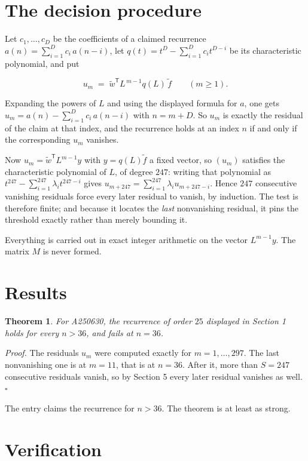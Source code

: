 \documentclass[11pt]{article}
\newtheorem{theorem}{Theorem}
\theoremstyle{definition}
\begin{document}
\section{The decision procedure}

Let $c_1,\dots,c_D$ be the coefficients of a claimed recurrence $a(n) = \sum_{i=1}^{D} c_i\,a(n-i)$, let $q(t) = t^{D} - \sum_{i=1}^{D} c_i t^{D-i}$ be its characteristic polynomial, and put

\[u_m \;=\; \tilde w^{\mathsf T} L^{\,m-1} q(L)\,\tilde f \qquad (m \ge 1).\]

Expanding the powers of $L$ and using the displayed formula for $a$, one gets $u_m = a(n) - \sum_{i=1}^{D} c_i\,a(n-i)$ with $n = m + D$. So $u_m$ is exactly the residual of the claim at that index, and the recurrence holds at an index $n$ if and only if the corresponding $u_m$ vanishes.

Now $u_m = \tilde w^{\mathsf T} L^{m-1} y$ with $y = q(L)\tilde f$ a fixed vector, so $(u_m)$ satisfies the characteristic polynomial of $L$, of degree $247$: writing that polynomial as $t^{247} - \sum_{i=1}^{247} \lambda_i t^{247-i}$ gives $u_{m+247} = \sum_{i=1}^{247} \lambda_i u_{m+247-i}$. Hence $247$ consecutive vanishing residuals force every later residual to vanish, by induction. The test is therefore finite; and because it locates the {\itshape last} nonvanishing residual, it pins the threshold exactly rather than merely bounding it.

Everything is carried out in exact integer arithmetic on the vector $L^{m-1}y$. The matrix $M$ is never formed.

\section{Results}

\begin{theorem} For A250630, the recurrence of order $25$ displayed in Section 1 holds for every $n > 36$, and fails at $n = 36$.\end{theorem}

{\itshape Proof.} The residuals $u_m$ were computed exactly for $m = 1,\dots,297$. The last nonvanishing one is at $m = 11$, that is at $n = 36$. After it, more than $S = 247$ consecutive residuals vanish, so by Section 5 every later residual vanishes as well. $\square$

The entry claims the recurrence for $n > 36$. The theorem is at least as strong.

\section{Verification}
\end{document}
